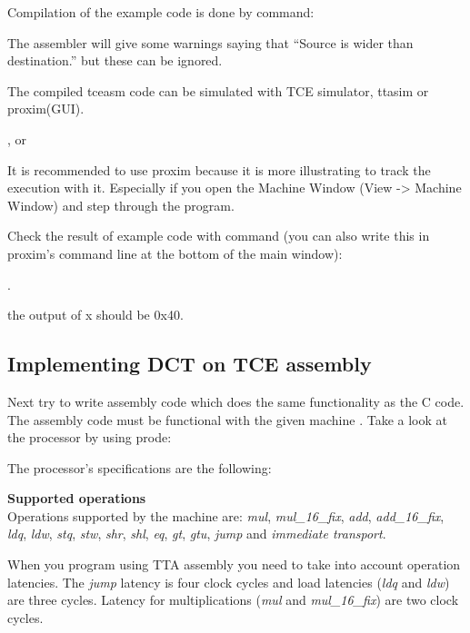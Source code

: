 \documentclass[twoside]{tceusermanual}
\begin{document}
Compilation of the example code is done by command:


The assembler will give some warnings saying that ``Source is
wider than destination.'' but these can be ignored.

The compiled tceasm code can be simulated with TCE
simulator, ttasim or proxim(GUI).

 , or


It is recommended to use proxim because it is more illustrating to track the
execution with it. Especially if you open the Machine Window (View -> Machine
Window) and step through the program.

Check the result of example code with command (you can also write this in
proxim's command line at the bottom of the main window):

. 

the output of x should be 0x40.

\subsection{Implementing DCT on TCE assembly}

Next try to write assembly code which does the same functionality as the
C code. The assembly code must be functional with the given machine
\file{dct\_8x8\_16\_bit\_with\_sfus.adf}. Take a look at the processor by
using prode:


The processor's specifications are the following:

\textbf{Supported operations} \\
Operations supported by the machine are: \textit{mul}, \textit{mul\_16\_fix},
\textit{add}, \textit{add\_16\_fix}, \textit{ldq}, \textit{ldw}, \textit{stq},
\textit{stw}, \textit{shr}, \textit{shl}, \textit{eq}, \textit{gt},
\textit{gtu}, \textit{jump} and \textit{immediate transport}.

When you program using TTA assembly you need to take into account 
operation latencies. The \textit{jump} latency is four clock cycles and load
latencies (\textit{ldq} and \textit{ldw}) are three cycles. Latency for
multiplications (\textit{mul} and \textit{mul\_16\_fix}) are two clock cycles.
\end{document}
